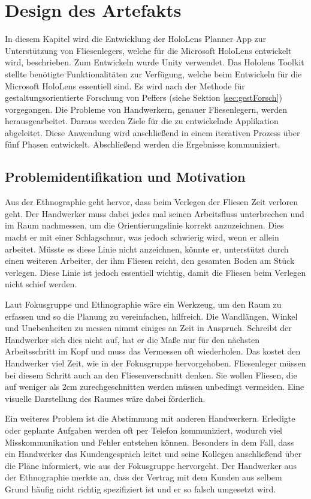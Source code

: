 \chapter{Design des Artefakts}

In diesem Kapitel wird die Entwicklung der HoloLens Planner App zur Unterstützung von Fliesenlegers, welche für die Microsoft HoloLens entwickelt wird, beschrieben. Zum Entwickeln wurde Unity verwendet. Das Hololens Toolkit stellte benötigte Funktionalitäten zur Verfügung, welche beim Entwickeln für die Microsoft HoloLens essentiell sind.
Es wird nach der Methode für gestaltungsorientierte Forschung von Peffers (siehe Sektion \ref{sec:gestForsch}) vorgegangen. Die Probleme von Handwerkern, genauer Fliesenlegern, werden herausgearbeitet. Daraus werden Ziele für die zu entwickelnde Applikation abgeleitet. Diese Anwendung wird anschließend in einem iterativen Prozess über fünf Phasen entwickelt. Abschließend werden die Ergebnisse kommuniziert.

\section{Problemidentifikation und Motivation}

Aus der Ethnographie geht hervor, dass beim Verlegen der Fliesen Zeit verloren geht. Der Handwerker muss dabei jedes mal seinen Arbeitsfluss unterbrechen und im Raum nachmessen, um die Orientierungslinie korrekt anzuzeichnen. Dies macht er mit einer Schlagschnur, was jedoch schwierig wird, wenn er allein arbeitet. Müsste es diese Linie nicht anzeichnen, könnte er, unterstützt durch einen weiteren Arbeiter, der ihm Fliesen reicht, den gesamten Boden am Stück verlegen. Diese Linie ist jedoch essentiell wichtig, damit die Fliesen beim Verlegen nicht schief werden.

Laut Fokusgruppe und Ethnographie wäre ein Werkzeug, um den Raum zu erfassen und so die Planung zu vereinfachen, hilfreich. Die Wandlängen, Winkel und Unebenheiten zu messen nimmt einiges an Zeit in Anspruch. Schreibt der Handwerker sich dies nicht auf, hat er die Maße nur für den nächsten Arbeitsschritt im Kopf und muss das Vermessen oft wiederholen. Das kostet den Handwerker viel Zeit, wie in der Fokusgruppe hervorgehoben. Fliesenleger müssen bei diesem Schritt auch an den Fliesenverschnitt denken. Sie wollen Fliesen, die auf weniger als 2cm zurechgeschnitten werden müssen unbedingt vermeiden. Eine visuelle Darstellung des Raumes wäre dabei förderlich. 

Ein weiteres Problem ist die Abstimmung mit anderen Handwerkern. Erledigte oder geplante Aufgaben werden oft per Telefon kommuniziert, wodurch viel Misskommunikation und Fehler entstehen können. Besonders in dem Fall, dass ein Handwerker das Kundengespräch leitet und seine Kollegen anschließend über die Pläne informiert, wie aus der Fokusgruppe hervorgeht. Der Handwerker aus der Ethnographie merkte an, dass der Vertrag mit dem Kunden aus selbem Grund häufig nicht richtig spezifiziert ist und er so falsch umgesetzt wird.


